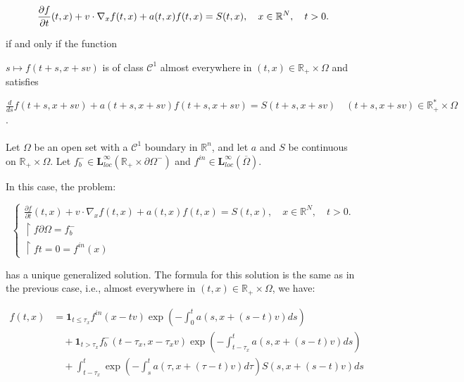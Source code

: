 \documentclass[onecolumn, 12pt, a4paper]{article}
\begin{document}
	$$\frac{\partial f}{\partial t}(t,x)+v \cdot \nabla_x f(t,x)+ a(t,x)f(t,x)=S(t,x), \quad x \in \mathbb{R}^N, \quad t>0.\\$$
	
	if and only if the function
	
	$s \mapsto f(t+s,x+sv)$ is of class $\mathcal{C}^1$ almost everywhere in $(t,x) \in \mathbb{R}_+ \times \Omega$ and satisfies
	
	$\frac{d}{ds}f(t+s,x+sv) +a(t+s,x+sv)f(t+s,x+sv) = S(t+s,x+sv) \quad (t+s,x+sv) \in \mathbb{R}_+^* \times \Omega$.
	
	
	\paragraph{}
	
	
	
	Let $\Omega$ be an open set with a $\mathcal{C}^1$ boundary in $\mathbb{R}^n$, and let $a$ and $S$ be continuous on $\mathbb{R}_+ \times \Omega$. Let $f_b^- \in \mathbf{L}_{loc}^{\infty}(\mathbb{R}_+ \times \partial \Omega^-)$ and $f^{in} \in \mathbf{L}_{loc}^{\infty}(\overline{\Omega})$.
	
	In this case, the problem:
	
	\[
	\begin{cases}
		\frac{\partial f}{\partial t}(t,x)+v \cdot \nabla_x f(t,x)+ a(t,x)f(t,x)=S(t,x), \quad x \in \mathbb{R}^N, \quad t>0.\\
		\restriction{f}{\partial \Omega}= f_b^-\\
		\restriction{f}{t=0}= f^{in}(x)
	\end{cases}
	\]
	
	has a unique generalized solution. The formula for this solution is the same as in the previous case, i.e., almost everywhere in $(t,x) \in \mathbb{R}_+ \times \Omega$, we have:
	
	\[
	\boxed{
		\begin{aligned}
			f(t,x) &= \mathbf{1}_{t \leq \tau_x} f^{in} (x-tv) \exp\left(-\int_0^t a(s,x+(s-t)v)ds\right) \\
			&\quad + \mathbf{1}_{t > \tau_x} f_b^- (t-\tau_x,x-\tau_x v) \exp\left(-\int_{t-\tau_x}^t a(s,x+(s-t)v)ds\right) \\
			&\quad + \int_{t-\tau_x}^t \exp\left(-\int_{s}^{t}a(\tau,x+(\tau-t)v)d\tau\right) S(s,x+(s-t)v)ds
	\end{aligned}}
	\]
	
	
	
	
	
	
	
\end{document}
